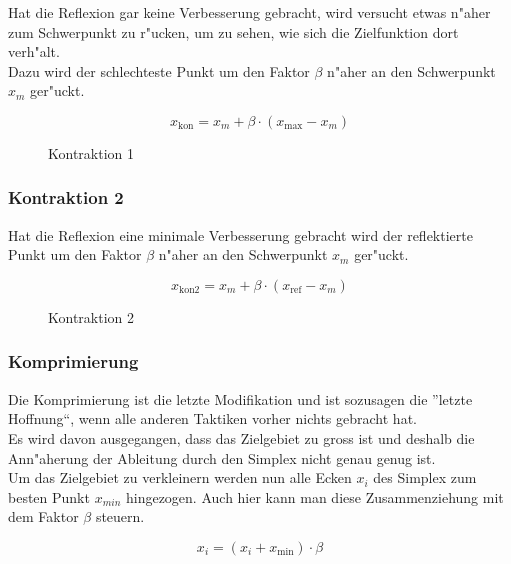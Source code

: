 Hat die Reflexion gar keine Verbesserung gebracht, wird versucht etwas n"aher zum Schwerpunkt zu r"ucken, um zu sehen, wie sich die Zielfunktion dort verh"alt.\\
Dazu wird der schlechteste Punkt um den Faktor $\beta$ n"aher an den Schwerpunkt $x_m$ ger"uckt. 

\begin{equation}
x_{\text{kon}} = x_{m} + \beta \cdot (x_{\text{max}}-x_{m})
\end{equation}

\begin{figure}[h]
	\centering
  	\caption{Kontraktion 1}%
	\label{fig:Kon1}%
\end{figure}

\subsubsection{Kontraktion 2}

Hat die Reflexion eine minimale Verbesserung gebracht wird der reflektierte Punkt um den Faktor $\beta$ n"aher an den Schwerpunkt $x_m$ ger"uckt. 

\begin{equation}
x_{\text{kon2}} = x_{m} + \beta \cdot (x_{\text{ref}}-x_{m})
\end{equation}

\begin{figure}[h]
	\centering
  	\caption{Kontraktion 2}%
	\label{fig:Kon2}%
\end{figure}

\subsubsection{Komprimierung}
Die Komprimierung ist die letzte Modifikation und ist sozusagen die ''letzte Hoffnung``, wenn alle anderen Taktiken vorher nichts gebracht hat.\\
Es wird davon ausgegangen, dass das Zielgebiet zu gross ist und deshalb die Ann"aherung der Ableitung durch den Simplex nicht genau genug ist.\\
Um das Zielgebiet zu verkleinern werden nun alle Ecken $x_i$ des Simplex zum besten Punkt $x_{min}$ hingezogen. Auch hier kann man diese Zusammenziehung mit dem Faktor $\beta$ steuern.  

\begin{equation}
x_{i} = (x_i + x_{\text{min}}) \cdot \beta
\end{equation}

